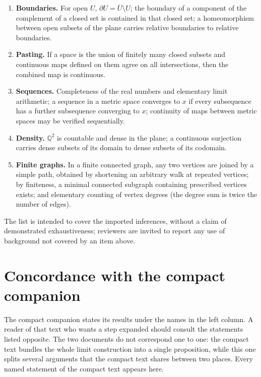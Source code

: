 \documentclass[11pt]{article}
\theoremstyle{mainplain}
\theoremstyle{mainroman}
\theoremstyle{definition}
\numberwithin{equation}{section}
\begin{document}
\begin{enumerate}
      connectedness; connected components, and the fact that
      components of open subsets of the plane are open; more
      generally, in a locally path-connected space, components of
      relatively open subsets are relatively open.
\item \textbf{Boundaries.} For open \(U\),
      \(\partial U=\overline U\setminus U\); the boundary of a
      component of the complement of a closed set is contained in that
      closed set; a homeomorphism between open subsets of the plane
      carries relative boundaries to relative boundaries.
\item \textbf{Pasting.} If a space is the union of finitely many
      closed subsets and continuous maps defined on them agree on all
      intersections, then the combined map is continuous.
\item \textbf{Sequences.} Completeness of the real numbers and
      elementary limit arithmetic; a sequence in a metric space
      converges to \(x\) if every subsequence has a further
      subsequence converging to \(x\); continuity of maps between
      metric spaces may be verified sequentially.
\item \textbf{Density.} \(\mathbb Q^2\) is countable and dense in the
      plane; a continuous surjection carries dense subsets of its
      domain to dense subsets of its codomain.
\item \textbf{Finite graphs.} In a finite connected graph, any two
      vertices are joined by a simple path, obtained by shortening an
      arbitrary walk at repeated vertices; by finiteness, a minimal
      connected subgraph containing prescribed vertices exists; and
      elementary counting of vertex degrees (the degree sum is twice
      the number of edges).
\end{enumerate}

The list is intended to cover the imported inferences, without a
claim of demonstrated exhaustiveness; reviewers are invited to report
any use of background not covered by an item above.

\section{Concordance with the compact companion}\label{app:concordance}

The compact companion states its results under the names in the left
column. A reader of that text who wants a step expanded should consult
the statements listed opposite. The two documents do not correspond one
to one: the compact text bundles the whole limit construction into a
single proposition, while this one splits several arguments that the
compact text shares between two places. Every named statement of the
compact text appears here.
\end{document}
